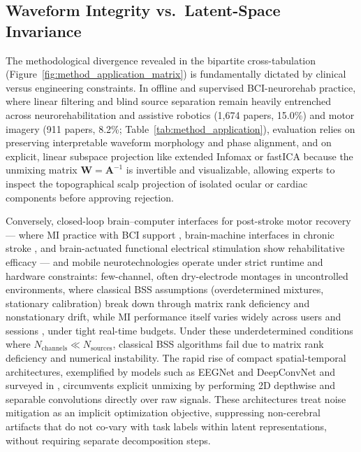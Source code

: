 \documentclass[preprint,12pt]{elsarticle}
\begin{document}
\subsection{Waveform Integrity vs.\ Latent-Space Invariance}
The methodological divergence revealed in the bipartite cross-tabulation (Figure~\ref{fig:method_application_matrix}) is fundamentally dictated by clinical versus engineering constraints. In offline and supervised BCI-neurorehab practice, where linear filtering and blind source separation remain heavily entrenched across neurorehabilitation and assistive robotics (1,674 papers, 15.0\%) and motor imagery (911 papers, 8.2\%; Table~\ref{tab:method_application}), evaluation relies on preserving interpretable waveform morphology and phase alignment, and on explicit, linear subspace projection like extended Infomax or fastICA \cite{delorme2004eeglab, jung2000removing} because the unmixing matrix $\mathbf{W} = \mathbf{A}^{-1}$ is invertible and visualizable, allowing experts to inspect the topographical scalp projection of isolated ocular or cardiac components before approving rejection.

Conversely, closed-loop brain--computer interfaces for post-stroke motor recovery --- where MI practice with BCI support \cite{pichiorri2015brain}, brain-machine interfaces in chronic stroke \cite{ramosmurguialday2013brain}, and brain-actuated functional electrical stimulation \cite{biasiucci2018brain, ren2024festimeta} show rehabilitative efficacy --- and mobile neurotechnologies \cite{debener2012how, lopezgordo2014dry} operate under strict runtime and hardware constraints: few-channel, often dry-electrode montages in uncontrolled environments, where classical BSS assumptions (overdetermined mixtures, stationary calibration) break down through matrix rank deficiency and nonstationary drift, while MI performance itself varies widely across users and sessions \cite{ahn2015performance}, under tight real-time budgets. Under these underdetermined conditions where $N_{\text{channels}} \ll N_{\text{sources}}$, classical BSS algorithms fail due to matrix rank deficiency and numerical instability. The rapid rise of compact spatial-temporal architectures, exemplified by models such as EEGNet \cite{lawhern2018eegnet} and DeepConvNet \cite{schirrmeister2017deep} and surveyed in \cite{roy2019deep, craik2019deep}, circumvents explicit unmixing by performing 2D depthwise and separable convolutions directly over raw signals. These architectures treat noise mitigation as an implicit optimization objective, suppressing non-cerebral artifacts that do not co-vary with task labels within latent representations, without requiring separate decomposition steps.
\end{document}
